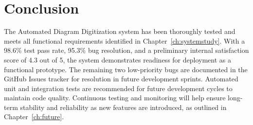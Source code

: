 \section{Conclusion}
\label{sec:testing-conclusion}

The Automated Diagram Digitization system has been thoroughly 
tested and meets all functional requirements identified in 
Chapter~\ref{ch:systemstudy}. With a 98.6\% test pass rate, 
95.3\% bug resolution, and a preliminary internal satisfaction 
score of 4.3 out of 5, the system demonstrates readiness for 
deployment as a functional prototype. The remaining two 
low-priority bugs are documented in the GitHub Issues tracker 
for resolution in future development sprints. Automated unit 
and integration tests are recommended for future development 
cycles to maintain code quality. Continuous testing and 
monitoring will help ensure long-term stability and reliability 
as new features are introduced, as outlined in 
Chapter~\ref{ch:future}.